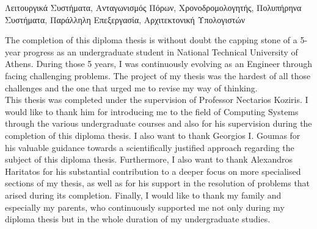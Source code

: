 \documentclass[diploma]{Styles/softlab-thesis}
\begin{document}
\begin{abstractgr}
\begin{keywordsgr}
Λειτουργικά Συστήματα, Ανταγωνισμός Πόρων, Χρονοδρομολογητής, Πολυπήρηνα Συστήματα, Παράλληλη Επεξεργασία, Αρχιτεκτονική Υπολογιστών
\end{keywordsgr}
\end{abstractgr}

\normalsize




\begin{acknowledgementsgr}
{}
The completion of this diploma thesis is without doubt the capping stone of a 5-year progress as an undergraduate student in National Technical University of Athens. During those 5 years, I was continuously evolving as an Engineer through facing challenging problems. The project of my thesis was the hardest of all those challenges and the one that urged me to revise my way of thinking. \\

This thesis was completed under the supervision of Professor Nectarios Koziris. I would like to thank him for introducing me to the field of Computing Systems through the various undergraduate courses and also for his supervision during the completion of this diploma thesis. I also want to thank Georgios I. Goumas for his valuable guidance towards a scientifically justified approach regarding the subject of this diploma thesis. Furthermore, I also want to thank Alexandros Haritatos for his substantial contribution to a deeper focus on more specialised sections of my thesis, as well as for his support in the resolution of problems that arised during its completion. Finally, I would like to thank my family and especially my parents, who continuously supported me not only during my diploma thesis but in the whole duration of my undergraduate studies. 

\end{acknowledgementsgr}


\cleardoublepage
{}
{}
\tableofcontents

\cleardoublepage
{}
{}
\listoftables

\cleardoublepage
{}
{}
\listoffigures


\end{document}
